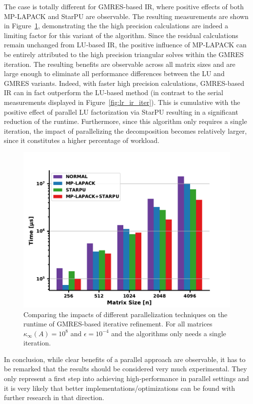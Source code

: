 The case is totally different for GMRES-based IR, where positive effects of both MP-LAPACK and StarPU are observable. The resulting measurements are shown in Figure~\hyperref[fig:gnres_parallel]{\ref{fig:gmres_parallel}}, demonstrating the the high precision calculations are indeed a limiting factor for this variant of the algorithm. Since the residual calculations remain unchanged from LU-based IR, the positive influence of MP-LAPACK can be entirely attributed to the high precision triangular solves within the GMRES iteration. The resulting benefits are observable across all matrix sizes and are large enough to eliminate all performance differences between the LU and GMRES variants. Indeed, with faster high precision calculations, GMRES-based IR can in fact outperform the LU-based method (in contrast to the serial measurements displayed in Figure~\hyperref[fig:lr_ir_iter]{\ref{fig:lr_ir_iter}}). 
This is cumulative with the positive effect of parallel LU factorization via StarPU resulting in a significant reduction of the runtime. Furthermore, since this algorithm only requires a single iteration, the impact of parallelizing the decomposition becomes relatively larger, since it constitutes a higher percentage of workload.

\begin{figure}[h]
    \centering
    \includegraphics[width=0.8\linewidth]{chapters/5_experiments/figures/GMRES_parallel.pdf}
    \caption[Parallel GMRES-based IR]{Comparing the impacts of different parallelization techniques on the runtime of GMRES-based iterative refinement. For all matrices $\kappa_\infty(A)=10^8$ and $\epsilon=10^{-4}$ and the algorithms only needs a single iteration.}
    \label{fig:gmres_parallel}
\end{figure}

In conclusion, while clear benefits of a parallel approach are observable, it has to be remarked that the results should be considered very much experimental. They only represent a first step into achieving high-performance in parallel settings and it is very likely that better implementations/optimizations can be found with further research in that direction. 
